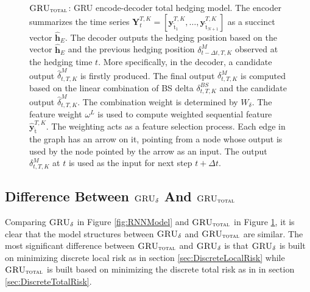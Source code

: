\documentclass[letterpaper,12pt,titlepage,oneside,final]{book}
\numberwithin{equation}{section}
\theoremstyle{definition}
\newcommand{\model}{\textsc{GRU}_\delta}
\newcommand{\modelT}{\textsc{GRU}_{\textsc{total}}}
\newcommand{\vy}{\mathbf{y}}
\newcommand{\DT}{\Delta t}
\newcommand{\nt}{\breve{\text{t}}}
\begin{document}
\begin{figure}[htp!]
{
	}
	\caption{$\modelT$: GRU encode-decoder total hedging model. The encoder summarizes the time series $\mathbf{Y}_{t}^{T,K}=\left[\vy^{T,K}_{\nt_{1}},\dots,\vy^{T,K}_{\nt_{N+1}}\right]$ as a succinct  vector $\widehat{\mathbf{h}}_E$. The decoder outputs the hedging position based on the vector $\widehat{\mathbf{h}}_E$ and the previous hedging position $\delta^M_{t-\Delta t,T,K}$ observed at the hedging time $t$. More specifically, in the decoder, a candidate output $\widehat{\delta}^M_{t,T,K}$ is firstly produced. The final output $\delta^M_{t,T,K}$ is computed based on the linear combination of BS delta $\delta^{BS}_{t,T,K}$ and the candidate output  $\widehat{\delta}^M_{t,T,K}$. The combination weight is determined by  $W_{\delta}$. The feature weight $\omega^L$ is used to compute weighted sequential feature $\widehat{\vy}^{T,K}_{\nt}$. The weighting acts as a feature selection process.
		Each edge in the graph has an arrow on it, pointing from a node whose output is used by the node pointed by the arrow as an input. The output $\delta^M_{t,T,K}$ at $t$ is used as the input for next step $t+\DT$.}
	\label{fig:RNNModelTotal}
\end{figure}



\subsection{Difference Between  $\model$ And $\modelT$}
Comparing  $\model$  in Figure \ref{fig:RNNModel} and  $\modelT$  in Figure \ref{fig:RNNModelTotal}, it is clear that the model structures between $\model$ and $\modelT$ are similar. 
The most significant difference between  $\modelT$ and  $\model$ is that $\model$ is built on minimizing discrete local risk as in section \ref{sec:DiscreteLocalRisk} while $\modelT$ is built based on minimizing the discrete total risk as in in section \ref{sec:DiscreteTotalRisk}.
\end{document}
